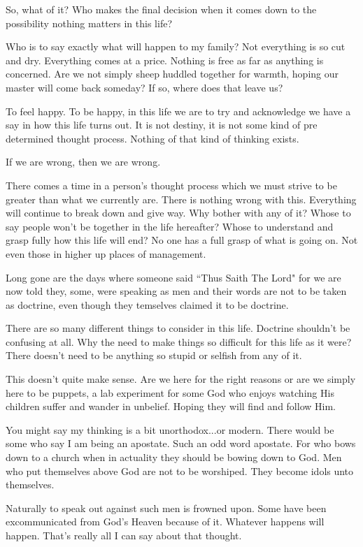 So, what of it? Who makes the final decision when it comes down to the
possibility nothing matters in this life?

Who is to say exactly what will happen to my family? Not everything is so cut
and dry. Everything comes at a price. Nothing is free as far as anything is
concerned. Are we not simply sheep huddled together for warmth, hoping our
master will come back someday? If so, where does that leave us?

To feel happy. To be happy, in this life we are to try and acknowledge we have a
say in how this life turns out. It is not destiny, it is not some kind of pre
determined thought process. Nothing of that kind of thinking exists.

If we are wrong, then we are wrong.

There comes a time in a person's thought process which we must strive to be
greater than what we currently are. There is nothing wrong with this. Everything
will continue to break down and give way. Why bother with any of it? Whose to
say people won't be together in the life hereafter? Whose to understand and
grasp fully how this life will end? No one has a full grasp of what is going on.
Not even those in higher up places of management.

Long gone are the days where someone said ``Thus Saith The Lord" for we are now
told they, some, were speaking as men and their words are not to be taken as
doctrine, even though they temselves claimed it to be doctrine.

There are so many different things to consider in this life. Doctrine shouldn't
be confusing at all. Why the need to make things so difficult for this life as
it were? There doesn't need to be anything so stupid or selfish from any of it.

This doesn't quite make sense. Are we here for the right reasons or are we
simply here to be puppets, a lab experiment for some God who enjoys watching His
children suffer and wander in unbelief. Hoping they will find and follow Him.

You might say my thinking is a bit unorthodox...or modern. There would be some
who say I am being an apostate. Such an odd word apostate. For who bows down to
a church when in actuality they should be bowing down to God. Men who put
themselves above God are not to be worshiped. They become idols unto themselves.

Naturally to speak out against such men is frowned upon. Some have been
excommunicated from God's Heaven because of it. Whatever happens will happen.
That's really all I can say about that thought.
